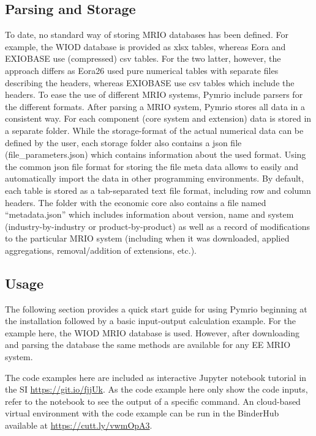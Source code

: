 \documentclass{jors}
\begin{document}
\subsection*{Parsing and Storage}

To date, no standard way of storing MRIO databases has been defined.
For example, the WIOD database \cite{timmer2015_Illustrated} is provided as xlsx tables, whereas Eora \cite{lenzen2013_Building} and EXIOBASE \cite{stadler2018_EXIOBASE} use (compressed) csv tables.
For the two latter, however, the approach differs as Eora26 used pure numerical tables with separate files describing the headers, whereas EXIOBASE use csv tables which include the headers.
To ease the use of different MRIO systems, Pymrio include parsers for the different formats.
After parsing a MRIO system, Pymrio stores all data in a consistent way.
For each component (core system and extension) data is stored in a separate folder.
While the storage-format of the actual numerical data can be defined by the user, each storage folder also contains a json file (file\_parameters.json) which contains information about the used format. 
Using the common json file format for storing the file meta data  allows to easily and automatically import the data in other programming environments. 
By default, each table is stored as a tab-separated text file format, including row and column headers.
The folder with the economic core also contains a file named ``metadata.json'' which includes information about version, name and system (industry-by-industry or product-by-product) as well as a record of modifications to the particular MRIO system (including when it was downloaded, applied aggregations, removal/addition of extensions, etc.). 

\subsection*{Usage}

The following section provides a quick start guide for using Pymrio beginning at the installation followed by a basic input-output calculation example.
For the example here, the WIOD MRIO database \cite{timmer2015_Illustrated} is used. 
However, after downloading and parsing the database the same methods are available for any EE MRIO system.

The code examples here are included as interactive Jupyter notebook tutorial in the SI \url{https://git.io/fjjUk}.
As the code example here only show the code inputs, refer to the notebook to see the output of a specific command. 
An cloud-based virtual environment with the code example can be run in the BinderHub available at \url{https://cutt.ly/vwmOpA3}. 
\end{document}

